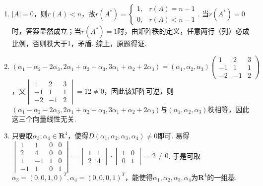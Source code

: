 \begin{enumerate}
    \item $|A|=0$，则$r(A)<n$，故$r(A^*)=\begin{cases}
                  1, & r(A)=n-1 \\
                  0, & r(A)<n-1
              \end{cases}$. 当$r(A^*)=0$时，答案显然成立；当$r(A^*)=1$时，由矩阵秩的定义，任意两行（列）必成比例，否则秩大于1，矛盾. 综上，原题得证.

    \item $(\alpha_1-\alpha_2-2\alpha_3,2\alpha_1+\alpha_2-\alpha_3,3\alpha_1+\alpha_2+2\alpha_3)=(\alpha_1,\alpha_2,\alpha_3)\begin{pmatrix}
                  1 & 2 & 3 \\ -1 & 1 & 1 \\ -2 & -1 & 2
              \end{pmatrix}$，又$\begin{vmatrix}
                  1 & 2 & 3 \\ -1 & 1 & 1 \\ -2 & -1 & 2
              \end{vmatrix}=12\neq 0$，因此该矩阵可逆，则$(\alpha_1-\alpha_2-2\alpha_3,2\alpha_1+\alpha_2-\alpha_3,3\alpha_1+\alpha_2+2\alpha_3)$与$(\alpha_1,\alpha_2,\alpha_3)$秩相等，因此这三个向量线性无关.

    \item 只要取$\alpha_3,\alpha_4 \in \mathbf{R}^4$，使得$D(\alpha_1,\alpha_2,\alpha_3,\alpha_4) \neq 0$即可. 易得$\begin{vmatrix}
                  1  & 1  & 0 & 0 \\
                  2  & 4  & 0 & 0 \\
                  1  & -1 & 1 & 0 \\
                  -1 & 1  & 0 & 1
              \end{vmatrix}=\begin{vmatrix}
                  1 & 1 \\
                  2 & 4
              \end{vmatrix} \cdot \begin{vmatrix}
                  1 & 0 \\
                  0 & 1
              \end{vmatrix}=2 \neq 0$. 于是可取$\alpha_3=(0,0,1,0)^T,\alpha_4=(0,0,0,1)^T$，能使得${\alpha_1,\alpha_2,\alpha_3,\alpha_4}$为$\mathbf{R}^4$的一组基.
\end{enumerate}

